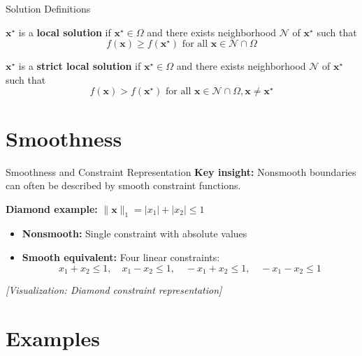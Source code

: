\documentclass[aspectratio=1610]{beamer}
\begin{document}
\begin{frame}{Solution Definitions}
  \begin{definition}
    $\mathbf{x}^{\star}$ is a \textbf{local solution} if $\mathbf{x}^{\star} \in \Omega$ and there exists neighborhood $\mathcal{N}$ of $\mathbf{x}^{\star}$ such that
    $$f(\mathbf{x}) \geq f(\mathbf{x}^{\star}) \text{ for all } \mathbf{x} \in \mathcal{N} \cap \Omega$$
  \end{definition}
  
  \begin{definition}
    $\mathbf{x}^{\star}$ is a \textbf{strict local solution} if $\mathbf{x}^{\star} \in \Omega$ and there exists neighborhood $\mathcal{N}$ of $\mathbf{x}^{\star}$ such that
    $$f(\mathbf{x}) > f(\mathbf{x}^{\star}) \text{ for all } \mathbf{x} \in \mathcal{N} \cap \Omega, \mathbf{x} \neq \mathbf{x}^{\star}$$
  \end{definition}
\end{frame}

\section{Smoothness}
\begin{frame}{Smoothness and Constraint Representation}
  \textbf{Key insight:} Nonsmooth boundaries can often be described by smooth constraint functions.
  
  \vspace{0.3cm}
  \textbf{Diamond example:} $\|\mathbf{x}\|_1 = |x_1| + |x_2| \leq 1$
  \begin{itemize}
    \item \textbf{Nonsmooth:} Single constraint with absolute values
    \item \textbf{Smooth equivalent:} Four linear constraints:
    $$x_1 + x_2 \leq 1, \quad x_1 - x_2 \leq 1, \quad -x_1 + x_2 \leq 1, \quad -x_1 - x_2 \leq 1$$
  \end{itemize}
  
  \vspace{0.5cm}
  \begin{center}
    \textit{[Visualization: Diamond constraint representation]}
  \end{center}
\end{frame}

\section{Examples}
\end{document}
